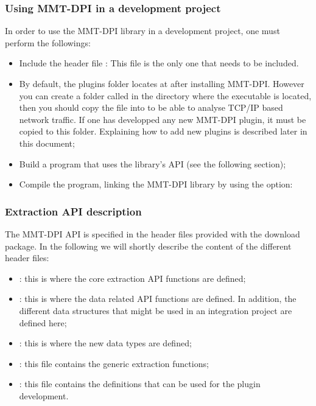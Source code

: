 \subsubsection{Using MMT-DPI in a development project}
In order to use the MMT-DPI library in a development project, one must perform the followings:

\begin{itemize}
\item Include the header file : This file is the only one that needs to be included. 
\item By default, the plugins folder locates at  after installing MMT-DPI. However you can create a folder called  in the directory where the executable is located, then you should copy the file  into  to be able to analyse TCP/IP based network traffic. If one has developped any new MMT-DPI plugin, it must be copied to this  folder. 
Explaining how to add new plugins is described later in this document;
\item Build a  program that uses the library's API (see the following section);
\item Compile the program, linking the MMT-DPI library by using the option:   
\end{itemize}
\subsubsection{Extraction API description }
The MMT-DPI API is specified in the header files provided with the download package. In the following we will shortly describe the content of the different header files:


\begin{itemize}
\item {}: this is where the core extraction API functions are defined; 
\item {}: this is where the data related API functions are defined. In addition, the different data structures that might be used in an integration project are defined here;
\item {}: this is where the new data types are defined;
\item {}: this file contains the generic extraction functions;
\item {}: this file contains the definitions that can be used for the plugin development.
\end{itemize}

